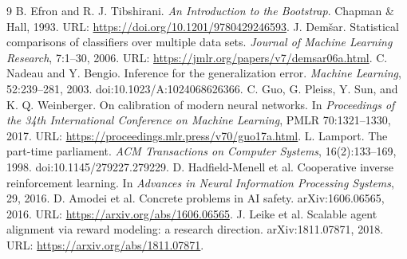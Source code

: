 \documentclass[11pt]{article}
\begin{document}
\begin{thebibliography}{9}
 B. Efron and R. J. Tibshirani. \emph{An Introduction to the Bootstrap}. Chapman \& Hall, 1993. URL: \url{https://doi.org/10.1201/9780429246593}.
 J. Dem\v{s}ar. Statistical comparisons of classifiers over multiple data sets. \emph{Journal of Machine Learning Research}, 7:1--30, 2006. URL: \url{https://jmlr.org/papers/v7/demsar06a.html}.
 C. Nadeau and Y. Bengio. Inference for the generalization error. \emph{Machine Learning}, 52:239--281, 2003. doi:10.1023/A:1024068626366.
 C. Guo, G. Pleiss, Y. Sun, and K. Q. Weinberger. On calibration of modern neural networks. In \emph{Proceedings of the 34th International Conference on Machine Learning}, PMLR 70:1321--1330, 2017. URL: \url{https://proceedings.mlr.press/v70/guo17a.html}.
 L. Lamport. The part-time parliament. \emph{ACM Transactions on Computer Systems}, 16(2):133--169, 1998. doi:10.1145/279227.279229.
 D. Hadfield-Menell et al. Cooperative inverse reinforcement learning. In \emph{Advances in Neural Information Processing Systems}, 29, 2016.
 D. Amodei et al. Concrete problems in AI safety. arXiv:1606.06565, 2016. URL: \url{https://arxiv.org/abs/1606.06565}.
 J. Leike et al. Scalable agent alignment via reward modeling: a research direction. arXiv:1811.07871, 2018. URL: \url{https://arxiv.org/abs/1811.07871}.
\end{thebibliography}
\end{document}
